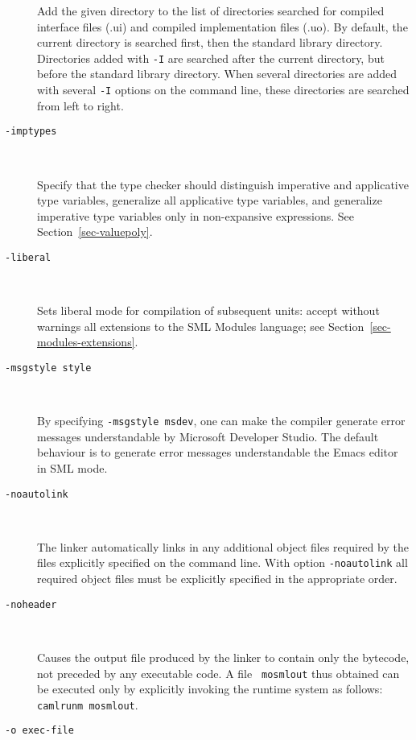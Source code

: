 \documentclass[fleqn,a4paper]{article}
\begin{document}
\begin{description}
  Add the given directory to the list of directories searched for
  compiled interface files (.ui) and compiled implementation files
  (.uo).  By default, the current directory is searched first, then
  the standard library directory.  Directories added with {\tt -I} are
  searched after the current directory, but before the standard
  library directory.  When several directories are added with several
  {\tt -I} options on the command line, these directories are searched
  from left to right.

\item[{\tt -imptypes}]\mbox{ }

  Specify that the type checker should distinguish imperative and
  applicative type variables, generalize all applicative type
  variables, and generalize imperative type variables only in
  non-expansive expressions.  See Section~\ref{sec-valuepoly}.

\item[{\tt -liberal}]\mbox{ }
  
  Sets liberal mode for compilation of subsequent units: accept
  without warnings all extensions to the SML Modules language; see
  Section~\ref{sec-modules-extensions}.

\item[{\tt -msgstyle \textrm{style}}]\mbox{ }
  
  By specifying \texttt{-msgstyle msdev}, one can make the compiler
  generate error messages understandable by Microsoft Developer
  Studio.  The default behaviour is to generate error messages
  understandable the Emacs editor in SML mode.

\item[{\tt -noautolink}]\mbox{ }
  
  The linker automatically links in any additional object files
  required by the files explicitly specified on the command line.
  With option {\tt -noautolink} all required object files must be
  explicitly specified in the appropriate order.

\item[{\tt -noheader}]\mbox{ }

  Causes the output file produced by the linker to contain only the
  bytecode, not preceded by any executable code.  A file {\tt
    mosmlout} thus obtained can be executed only by explicitly
  invoking the runtime system as follows: {\tt camlrunm mosmlout}.

\item[{\tt -o {\rm exec-file}}]\mbox{ }


\end{description}
\end{document}
